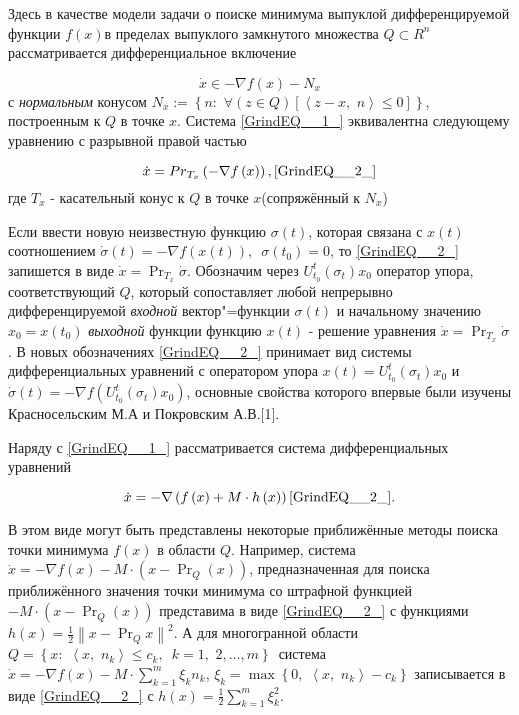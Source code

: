 \vzmscaption


Здесь в качестве модели задачи о поиске минимума выпуклой дифференцируемой функции $f\left(x\right)$в пределах выпуклого замкнутого множества $Q\subset R^{n} $рассматривается дифференциальное включение

\begin{equation} \label{GrindEQ__1_} \dot{x}\in -\nabla f\left(x\right)-N_{x}  \end{equation}
с \textit{нормальным} конусом $N_{x} :=\left\{n:\, \, \forall \left(z\in Q\right)\left[\left\langle z-x,\, \, n\right\rangle \le 0\right]\right\}$, построенным к $Q$ в точке $x$. Система \eqref{GrindEQ__1_}  эквивалентна следующему уравнению с разрывной правой частью

$$\dot{x}={Pr}_{T_{x} } \left(-\nabla f\left(x\right)\right),\eqref{GrindEQ__2_}$$
где $T_{x} $ - касательный конус к $Q$ в точке $x$(сопряжённый к $N_{x} $)

Если ввести новую неизвестную функцию $\sigma (t)$, которая связана с $x(t)$ соотношением $\dot{\sigma }(t)=-\nabla f\left(x\left(t\right)\right),\, \, \, \sigma (t_{0} )=0$, то \eqref{GrindEQ__2_} запишется в виде $\dot{x}=\Pr _{T_{x} } \dot{\sigma }$. Обозначим через $U_{t_{0} }^{t} (\sigma _{t} )x_{0} $ оператор упора, соответствующий $Q$, который сопоставляет любой непрерывно дифференцируемой \textit{входной }вектор"=функции $\sigma (t)$ и начальному значению $x_{0} =x(t_{0} )$\textit{ выходной} функции функцию $x(t)$ - решение уравнения $\dot{x}=\Pr _{T_{x} } \dot{\sigma }$. В новых обозначениях \eqref{GrindEQ__2_} принимает вид системы дифференциальных уравнений с оператором упора $x(t)=U_{t_{0} }^{t} (\sigma _{t} )x_{0} $ и $\dot{\sigma }(t)=-\nabla f\left(U_{t_{0} }^{t} (\sigma _{t} )x_{0} \right)$, основные свойства которого впервые были изучены Красносельским М.А и Покровским А.В.[1].

Наряду с \eqref{GrindEQ__1_} рассматривается система дифференциальных уравнений

$$\dot{x}=-\nabla \left(f\left(x\right)+M\cdot h\left(x\right)\right)\eqref{GrindEQ__2_}.$$

В этом виде могут быть представлены некоторые приближённые методы поиска точки минимума $f\left(x\right)$ в области $Q$. Например, система $\dot{x}=-\nabla f\left(x\right)-M\cdot \left(x-\Pr _{Q} \left(x\right)\right)$, предназначенная для поиска приближённого значения точки минимума со штрафной функцией $-M\cdot \left(x-\Pr _{Q} \left(x\right)\right)$ представима в виде \eqref{GrindEQ__2_} с функциями $h\left(x\right)=\frac{1}{2} \left\| x-\Pr _{Q} x\right\| ^{2} $. А для многогранной области $Q=\left\{x:\, \, \left\langle x,\, \, n_{k} \right\rangle \le c_{k} ,\, \, \, k=1,\, \, 2,\ldots ,m\right\}\, $ система $\dot{x}=-\nabla f\left(x\right)-M\cdot \sum _{k=1}^{m}\xi _{k} n_{k}  $, $\xi _{k} =\max \left\{0,\, \, \left\langle x,\, \, n_{k} \right\rangle -c_{k} \right\}$ записывается в виде \eqref{GrindEQ__2_} с $h\left(x\right)=\frac{1}{2} \sum _{k=1}^{m}\xi _{k}^{2}  $.

